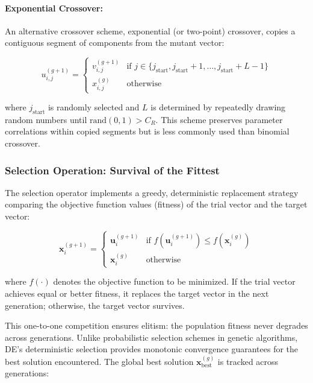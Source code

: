 \documentclass[12pt,a4paper]{report}
\begin{document}
\paragraph{Exponential Crossover:}

An alternative crossover scheme, exponential (or two-point) crossover, copies a contiguous segment of components from the mutant vector:

\begin{equation}
u_{i,j}^{(g+1)} = \begin{cases}
v_{i,j}^{(g+1)} & \text{if } j \in \{j_{\text{start}}, j_{\text{start}}+1, \ldots, j_{\text{start}}+L-1\} \\
x_{i,j}^{(g)} & \text{otherwise}
\end{cases}
\end{equation}

where $j_{\text{start}}$ is randomly selected and $L$ is determined by repeatedly drawing random numbers until $\text{rand}(0,1) > C_R$. This scheme preserves parameter correlations within copied segments but is less commonly used than binomial crossover.

\subsubsection{Selection Operation: Survival of the Fittest}

The selection operator implements a greedy, deterministic replacement strategy comparing the objective function values (fitness) of the trial vector and the target vector:

\begin{equation}
\mathbf{x}_i^{(g+1)} = \begin{cases}
\mathbf{u}_i^{(g+1)} & \text{if } f(\mathbf{u}_i^{(g+1)}) \leq f(\mathbf{x}_i^{(g)}) \\
\mathbf{x}_i^{(g)} & \text{otherwise}
\end{cases}
\label{eq:de_selection}
\end{equation}

where $f(\cdot)$ denotes the objective function to be minimized. If the trial vector achieves equal or better fitness, it replaces the target vector in the next generation; otherwise, the target vector survives.

This one-to-one competition ensures elitism: the population fitness never degrades across generations. Unlike probabilistic selection schemes in genetic algorithms, DE's deterministic selection provides monotonic convergence guarantees for the best solution encountered. The global best solution $\mathbf{x}_{\text{best}}^{(g)}$ is tracked across generations:
\end{document}
